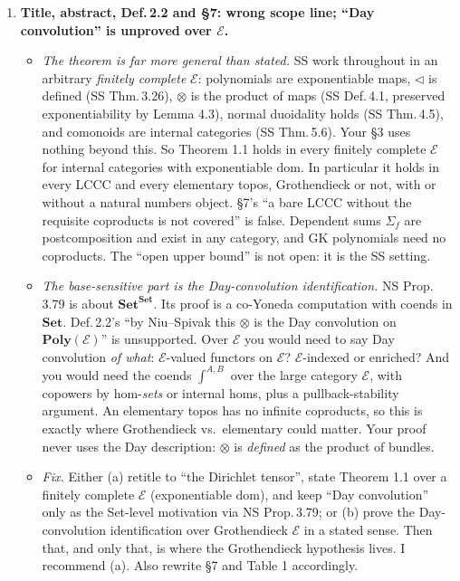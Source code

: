 \documentclass[11pt]{article}
\newcommand{\tri}{\mathbin{\triangleleft}}
\newcommand{\Poly}{\mathbf{Poly}}
\newcommand{\Set}{\mathbf{Set}}
\newcommand{\E}{\mathcal{E}}
\begin{document}
\begin{enumerate}[label=\textbf{M\arabic*.},leftmargin=*]
\item \textbf{Title, abstract, Def.\,2.2 and \S7: wrong scope line; ``Day convolution'' is unproved
  over $\E$.}
  \begin{itemize}[leftmargin=*]
  \item \emph{The theorem is far more general than stated.} SS work throughout in an arbitrary
    \emph{finitely complete} $\E$: polynomials are exponentiable maps, $\tri$ is defined (SS
    Thm.\,3.26), $\otimes$ is the product of maps (SS Def.\,4.1, preserved exponentiability by Lemma
    4.3), normal duoidality holds (SS Thm.\,4.5), and comonoids are internal categories (SS
    Thm.\,5.6). Your \S3 uses nothing beyond this. So Theorem 1.1 holds in every finitely complete
    $\E$ for internal categories with exponentiable $\mathrm{dom}$. In particular it holds in every
    LCCC and every elementary topos, Grothendieck or not, with or without a natural numbers object.
    \S7's ``a bare LCCC without the requisite coproducts is not covered'' is false. Dependent sums
    $\Sigma_f$ are postcomposition and exist in any category, and GK polynomials need no coproducts.
    The ``open upper bound'' is not open: it is the SS setting.
  \item \emph{The base-sensitive part is the Day-convolution identification.} NS Prop.\,3.79 is
    about $\Set^\Set$. Its proof is a co-Yoneda computation with coends in $\Set$. Def.\,2.2's
    ``by Niu--Spivak this $\otimes$ is the Day convolution on $\Poly(\E)$'' is unsupported. Over $\E$
    you would need to say Day convolution \emph{of what}: $\E$-valued functors on $\E$? $\E$-indexed or
    enriched? And you would need the coends $\int^{A,B}$ over the large category $\E$, with copowers by
    hom-\emph{sets} or internal homs, plus a pullback-stability argument. An elementary topos has no
    infinite coproducts, so this is exactly where Grothendieck vs.\ elementary could matter. Your
    proof never uses the Day description: $\otimes$ is \emph{defined} as the product of bundles.
  \item \emph{Fix.} Either (a) retitle to ``the Dirichlet tensor'', state Theorem 1.1 over a
    finitely complete $\E$ (exponentiable $\mathrm{dom}$), and keep ``Day convolution'' only as the
    Set-level motivation via NS Prop.\,3.79; or (b) prove the Day-convolution identification over
    Grothendieck $\E$ in a stated sense. Then that, and only that, is where the Grothendieck
    hypothesis lives. I recommend (a). Also rewrite \S7 and Table 1 accordingly.
  \end{itemize}
\end{enumerate}
\end{document}
